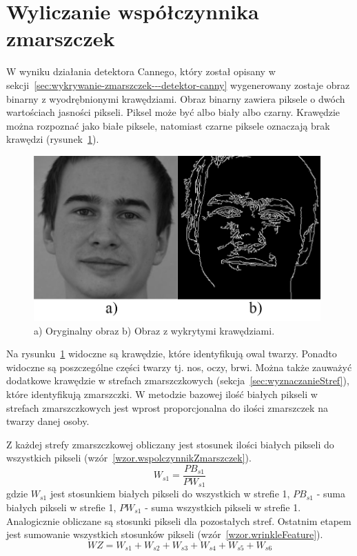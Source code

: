 \documentclass[a4paper,twoside,12pt]{book}
\begin{document}
    \section{Wyliczanie współczynnika zmarszczek}\label{sec:wyliczanieWrinkleFeature}
    W wyniku działania detektora Cannego, który został opisany w sekcji~\ref{sec:wykrywanie-zmarszczek---detektor-canny}
    wygenerowany zostaje obraz binarny z wyodrębnionymi krawędziami.
    Obraz binarny zawiera piksele o dwóch wartościach jasności pikseli.
    Piksel może być albo biały albo czarny.
    Krawędzie można rozpoznać jako białe piksele, natomiast czarne piksele oznaczają brak krawędzi (rysunek~\ref{fig.mojaTwarzGray}).

    \begin{figure}[h!]
        \centering
        \includegraphics[width=11cm]{Obrazy/mojaTwarzGray.jpg}
        \caption{a) Oryginalny obraz b) Obraz z wykrytymi krawędziami.}
        \label{fig.mojaTwarzGray}
    \end{figure}

    Na rysunku~\ref{fig.mojaTwarzGray} widoczne są krawędzie, które identyfikują owal twarzy.
    Ponadto widoczne są poszczególne części twarzy tj. nos, oczy, brwi.
    Można także zauważyć dodatkowe krawędzie w strefach zmarszczkowych (sekcja~\ref{sec:wyznaczanieStref}),
    które identyfikują zmarszczki.
    W metodzie bazowej ilość białych pikseli w strefach zmarszczkowych jest wprost proporcjonalna do ilości zmarszczek
    na twarzy danej osoby.

    Z każdej strefy zmarszczkowej obliczany jest stosunek ilości białych pikseli do wszystkich
    pikseli (wzór~\ref{wzor.wspolczynnikZmarszczek}).
    \large
    \begin{equation}
        W_{s1} = \frac{PB_{s1}}{PW_{s1}}
        \label{wzor.wspolczynnikZmarszczek}
    \end{equation}
    \normalsize
    gdzie $W_{s1}$ jest stosunkiem białych pikseli do wszystkich w strefie 1,
    $PB_{s1}$ - suma białych pikseli w strefie 1, $PW_{s1}$ - suma wszystkich pikseli w strefie 1.
    Analogicznie obliczane są stosunki pikseli dla pozostałych stref.
    Ostatnim etapem jest sumowanie wszystkich stosunków pikseli (wzór~\ref{wzor.wrinkleFeature}).
    \large
    \begin{equation}
        WZ = W_{s1} + W_{s2} + W_{s3} + W_{s4} + W_{s5} + W_{s6}
        \label{wzor.wrinkleFeature}
    \end{equation}
    \normalsize
\end{document}
